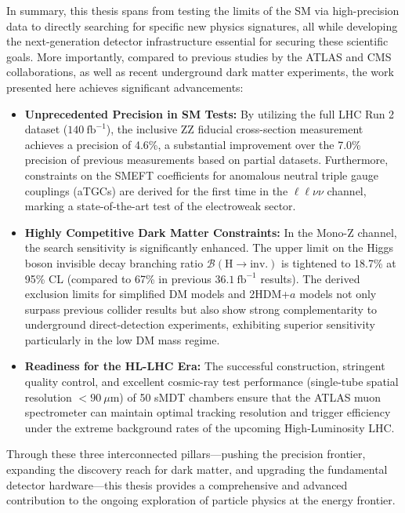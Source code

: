 In summary, this thesis spans from testing the limits of the SM via high-precision data to directly searching for specific new physics signatures, all while developing the next-generation detector infrastructure essential for securing these scientific goals. More importantly, compared to previous studies by the ATLAS and CMS collaborations, as well as recent underground dark matter experiments, the work presented here achieves significant advancements:

\begin{itemize}
    \item \textbf{Unprecedented Precision in SM Tests:} By utilizing the full LHC Run 2 dataset ($140~\text{fb}^{-1}$), the inclusive $\text{ZZ}$ fiducial cross-section measurement achieves a precision of 4.6\%, a substantial improvement over the 7.0\% precision of previous measurements based on partial datasets. Furthermore, constraints on the SMEFT coefficients for anomalous neutral triple gauge couplings (aTGCs) are derived for the first time in the $\ell\ell\nu\nu$ channel, marking a state-of-the-art test of the electroweak sector.
    \item \textbf{Highly Competitive Dark Matter Constraints:} In the Mono-$\text{Z}$ channel, the search sensitivity is significantly enhanced. The upper limit on the Higgs boson invisible decay branching ratio $\mathcal{B}(\text{H} \to \text{inv.})$ is tightened to 18.7\% at 95\% CL (compared to 67\% in previous $36.1~\text{fb}^{-1}$ results). The derived exclusion limits for simplified DM models and 2HDM+$a$ models not only surpass previous collider results but also show strong complementarity to underground direct-detection experiments, exhibiting superior sensitivity particularly in the low DM mass regime.
    \item \textbf{Readiness for the HL-LHC Era:} The successful construction, stringent quality control, and excellent cosmic-ray test performance (single-tube spatial resolution $< 90~\mu\text{m}$) of 50 sMDT chambers ensure that the ATLAS muon spectrometer can maintain optimal tracking resolution and trigger efficiency under the extreme background rates of the upcoming High-Luminosity LHC.
\end{itemize}

Through these three interconnected pillars—pushing the precision frontier, expanding the discovery reach for dark matter, and upgrading the fundamental detector hardware—this thesis provides a comprehensive and advanced contribution to the ongoing exploration of particle physics at the energy frontier.

